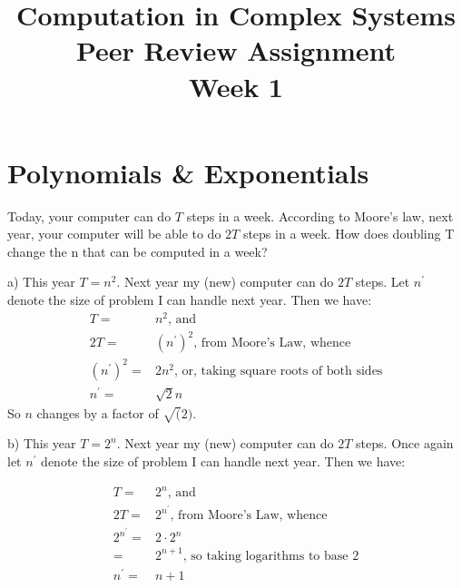 \documentclass[]{article}
\title{
	Computation in Complex Systems\\
	Peer Review Assignment\\
	Week 1
}
\begin{document}
\maketitle

\tableofcontents

\section{Polynomials \& Exponentials}

Today, your computer can do $T$ steps in a week. According to Moore's law, next year, your computer will be able to do $2T$ steps in a week. How does doubling T change the n that can be computed in a week? 

a) This year $T = n^2$. Next year my (new) computer can do $2T$ steps. Let $n^\prime$ denote the size of problem I can handle next year. Then we have:
\begin{align*}
	T =& n^2 \text{, and}\\
	2T =& (n^\prime)^2 \text{, from Moore's Law, whence}\\
	 (n^\prime)^2=& 2n^2 \text{, or, taking square roots of both sides}\\
	n^\prime=& \sqrt{2} n
\end{align*}
So $n$ changes by a factor of $\sqrt(2)$.

b) This year $T = 2^n$. Next year my (new) computer can do $2T$ steps. Once again let $n^\prime$ denote the size of problem I can handle next year. Then we have:

\begin{align*}
	T =&2^n \text{, and}\\
	2T =& 2^{n^\prime} \text{, from Moore's Law, whence}\\
	2^{n^\prime}=& 2\cdot 2^n\\
	=& 2^{n+1} \text{, so taking logarithms to base 2}\\
	n^\prime =& n+1
\end{align*}
\end{document}
